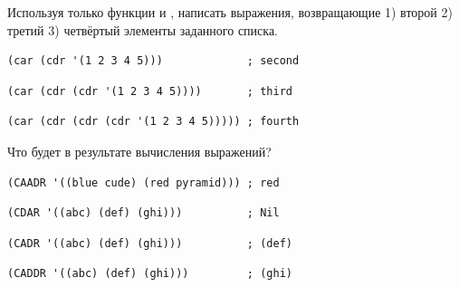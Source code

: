 \documentclass[a4paper]{report}
\begin{document}
\begin{task}
	Используя только функции  и , написать выражения, возвращающие 1) второй 2) третий 3) четвёртый элементы заданного списка.
\end{task}

\begin{AutoMultiColEnumerate}
	\item
\begin{lstlisting}[style=lispinline]
(car (cdr '(1 2 3 4 5)))             ; second
\end{lstlisting}

	\item
\begin{lstlisting}[style=lispinline]
(car (cdr (cdr '(1 2 3 4 5))))       ; third
\end{lstlisting}

	\item
\begin{lstlisting}[style=lispinline]
(car (cdr (cdr (cdr '(1 2 3 4 5))))) ; fourth
\end{lstlisting}
\end{AutoMultiColEnumerate}

\begin{task}
	Что будет в результате вычисления выражений?
	\begin{AutoMultiColEnumerate}
		\item
\begin{lstlisting}[style=lispinline]
(CAADR '((blue cude) (red pyramid))) ; red
\end{lstlisting}

		\item
\begin{lstlisting}[style=lispinline]
(CDAR '((abc) (def) (ghi)))          ; Nil
\end{lstlisting}

		\item
\begin{lstlisting}[style=lispinline]
(CADR '((abc) (def) (ghi)))          ; (def)
\end{lstlisting}

		\item
\begin{lstlisting}[style=lispinline]
(CADDR '((abc) (def) (ghi)))         ; (ghi)
\end{lstlisting}
	\end{AutoMultiColEnumerate}
\end{task}
\end{document}
